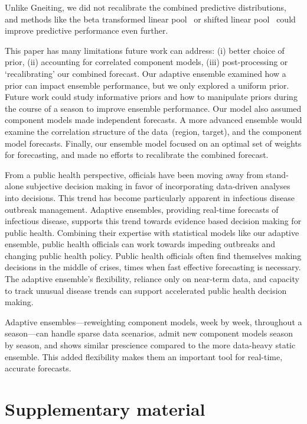 \documentclass[12pt]{article}
\begin{document}
Unlike Gneiting, we did not recalibrate the combined predictive distributions, and methods like the beta transformed linear pool~\cite{ranjan2010combining} or shifted linear pool~\cite{kleiber2011locally} could improve predictive performance even further.

This paper has many limitations future work can address: (i) better choice of prior, (ii) accounting for correlated component models, (iii) post-processing or `recalibrating' our combined forecast.
Our adaptive ensemble examined how a prior can impact ensemble performance, but we only explored a uniform prior.
Future work could study informative priors and how to manipulate priors during the course of a season to improve ensemble performance.
Our model also assumed component models made independent forecasts.
A more advanced ensemble would examine the correlation structure of the data~(region, target), and the component model forecasts.
Finally, our ensemble model focused on an optimal set of weights for forecasting, and made no efforts to recalibrate the combined forecast.\cite{gneiting2013combining}

From a public health perspective, officials have been moving away from stand-alone subjective decision making in favor of  incorporating data-driven analyses into decisions.
This trend has become particularly apparent in infectious disease outbreak management.\cite{Rivers2019}
Adaptive ensembles, providing real-time forecasts of infectious disease, supports this trend towards evidence based decision making for public health.
Combining their expertise with statistical models like our adaptive ensemble, public health officials can work towards impeding outbreaks and changing public health policy.
Public health officials often find themselves making decisions in the middle of crises, times when fast effective forecasting is necessary. 
The adaptive ensemble's flexibility, reliance only on near-term data, and capacity to track unusual disease trends can support accelerated public health decision making.

Adaptive ensembles---reweighting component models, week by week, throughout a season---can handle sparse data scenarios, admit new component models season by season, and shows similar prescience compared to the more data-heavy static ensemble.
This added flexibility makes them an important tool for real-time, accurate forecasts.


\section{Supplementary material}
\end{document}
